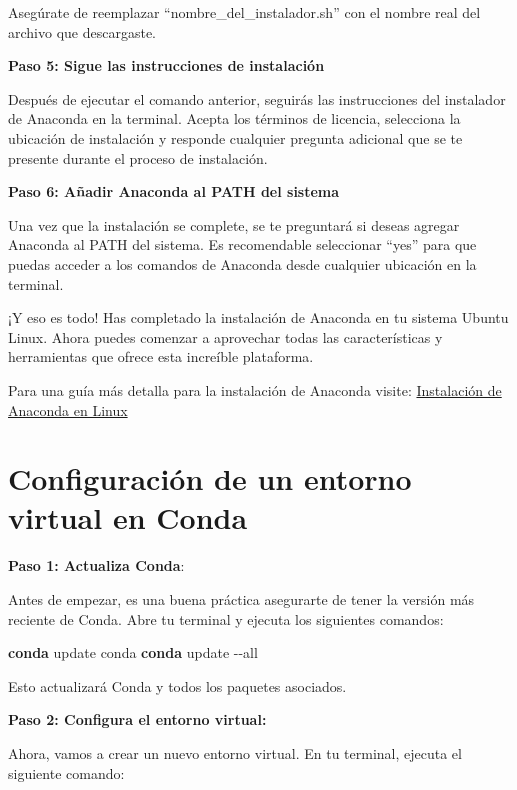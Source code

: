 \documentclass[
  a4paper,
]{article}
\newenvironment{Shaded}{}{}
\newcommand{\AttributeTok}[1]{\textcolor[rgb]{0.84,0.23,0.29}{#1}}
\newcommand{\ExtensionTok}[1]{\textcolor[rgb]{0.84,0.23,0.29}{\textbf{#1}}}
\newcommand{\NormalTok}[1]{\textcolor[rgb]{0.14,0.16,0.18}{#1}}
\begin{document}
Asegúrate de reemplazar ``nombre\_del\_instalador.sh'' con el nombre
real del archivo que descargaste.

\textbf{Paso 5: Sigue las instrucciones de instalación}

Después de ejecutar el comando anterior, seguirás las instrucciones del
instalador de Anaconda en la terminal. Acepta los términos de licencia,
selecciona la ubicación de instalación y responde cualquier pregunta
adicional que se te presente durante el proceso de instalación.

\textbf{Paso 6: Añadir Anaconda al PATH del sistema}

Una vez que la instalación se complete, se te preguntará si deseas
agregar Anaconda al PATH del sistema. Es recomendable seleccionar
``yes'' para que puedas acceder a los comandos de Anaconda desde
cualquier ubicación en la terminal.

¡Y eso es todo! Has completado la instalación de Anaconda en tu sistema
Ubuntu Linux. Ahora puedes comenzar a aprovechar todas las
características y herramientas que ofrece esta increíble plataforma.

Para una guía más detalla para la instalación de Anaconda visite:
\href{../2023-06-19-instalacion-de-anaconda/index.qmd}{Instalación de
Anaconda en Linux}

\hypertarget{configuraciuxf3n-de-un-entorno-virtual-en-conda}{%
\section{Configuración de un entorno virtual en
Conda}\label{configuraciuxf3n-de-un-entorno-virtual-en-conda}}

\textbf{Paso 1: Actualiza Conda}:

Antes de empezar, es una buena práctica asegurarte de tener la versión
más reciente de Conda. Abre tu terminal y ejecuta los siguientes
comandos:

\begin{Shaded}
\begin{Highlighting}[]
\ExtensionTok{conda}\NormalTok{ update conda}
\ExtensionTok{conda}\NormalTok{ update }\AttributeTok{{-}{-}all}
\end{Highlighting}
\end{Shaded}

Esto actualizará Conda y todos los paquetes asociados.

\textbf{Paso 2: Configura el entorno virtual:}

Ahora, vamos a crear un nuevo entorno virtual. En tu terminal, ejecuta
el siguiente comando:
\end{document}
